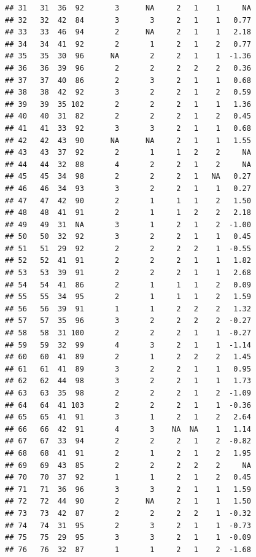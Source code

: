 \documentclass[
]{book}
\theoremstyle{definition}
\theoremstyle{definition}
\theoremstyle{definition}
\theoremstyle{definition}
\theoremstyle{remark}
\begin{document}
\begin{verbatim}
## 31   31  36  92       3      NA     2   1    1     NA
## 32   32  42  84       3       3     2   1    1   0.77
## 33   33  46  94       2      NA     2   1    1   2.18
## 34   34  41  92       2       1     2   1    2   0.77
## 35   35  30  96      NA       2     2   1    1  -1.36
## 36   36  39  96       2       2     2   2    2   0.36
## 37   37  40  86       2       3     2   1    1   0.68
## 38   38  42  92       3       2     2   1    2   0.59
## 39   39  35 102       2       2     2   1    1   1.36
## 40   40  31  82       2       2     2   1    2   0.45
## 41   41  33  92       3       3     2   1    1   0.68
## 42   42  43  90      NA      NA     2   1    1   1.55
## 43   43  37  92       2       1     1   2    2     NA
## 44   44  32  88       4       2     2   1    2     NA
## 45   45  34  98       2       2     2   1   NA   0.27
## 46   46  34  93       3       2     2   1    1   0.27
## 47   47  42  90       2       1     1   1    2   1.50
## 48   48  41  91       2       1     1   2    2   2.18
## 49   49  31  NA       3       1     2   1    2  -1.00
## 50   50  32  92       3       2     2   1    1   0.45
## 51   51  29  92       2       2     2   2    1  -0.55
## 52   52  41  91       2       2     2   1    1   1.82
## 53   53  39  91       2       2     2   1    1   2.68
## 54   54  41  86       2       1     1   1    2   0.09
## 55   55  34  95       2       1     1   1    2   1.59
## 56   56  39  91       1       1     2   2    2   1.32
## 57   57  35  96       3       2     2   2    2  -0.27
## 58   58  31 100       2       2     2   1    1  -0.27
## 59   59  32  99       4       3     2   1    1  -1.14
## 60   60  41  89       2       1     2   2    2   1.45
## 61   61  41  89       3       2     2   1    1   0.95
## 62   62  44  98       3       2     2   1    1   1.73
## 63   63  35  98       2       2     2   1    2  -1.09
## 64   64  41 103       2       2     2   1    1  -0.36
## 65   65  41  91       3       1     2   1    2   2.64
## 66   66  42  91       4       3    NA  NA    1   1.14
## 67   67  33  94       2       2     2   1    2  -0.82
## 68   68  41  91       2       1     2   1    2   1.95
## 69   69  43  85       2       2     2   2    2     NA
## 70   70  37  92       1       1     2   1    2   0.45
## 71   71  36  96       3       3     2   1    1   1.59
## 72   72  44  90       2      NA     2   1    1   1.50
## 73   73  42  87       2       2     2   2    1  -0.32
## 74   74  31  95       2       3     2   1    1  -0.73
## 75   75  29  95       3       3     2   1    1  -0.09
## 76   76  32  87       1       1     2   1    2  -1.68

\end{verbatim}
\end{document}
